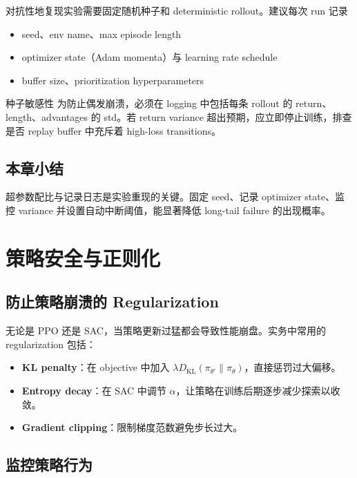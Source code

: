 \documentclass[a4paper]{article}
\begin{document}
对抗性地复现实验需要固定随机种子和 deterministic rollout。建议每次 run 记录

\begin{itemize}
    \item seed、env name、max episode length
    \item optimizer state（Adam momenta）与 learning rate schedule
    \item buffer size、prioritization hyperparameters
\end{itemize}

\begin{warningbox}{种子敏感性}
为防止偶发崩溃，必须在 logging 中包括每条 rollout 的 return、length、advantages 的 std。若 return variance 超出预期，应立即停止训练，排查是否 replay buffer 中充斥着 high-loss transitions。
\end{warningbox}

\subsection{本章小结}

超参数配比与记录日志是实验重现的关键。固定 seed、记录 optimizer state、监控 variance 并设置自动中断阈值，能显著降低 long-tail failure 的出现概率。

\section{策略安全与正则化}

\subsection{防止策略崩溃的 Regularization}

无论是 PPO 还是 SAC，当策略更新过猛都会导致性能崩盘。实务中常用的 regularization 包括：

\begin{itemize}
    \item \textbf{KL penalty}：在 objective 中加入 $\lambda D_{\mathrm{KL}}(\pi_{\theta'}\|\pi_\theta)$，直接惩罚过大偏移。
    \item \textbf{Entropy decay}：在 SAC 中调节 $\alpha$，让策略在训练后期逐步减少探索以收敛。
    \item \textbf{Gradient clipping}：限制梯度范数避免步长过大。
\end{itemize}

\subsection{监控策略行为}
\end{document}
